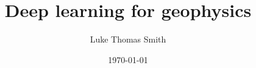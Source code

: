 \documentclass[12pt,a4paper,twocolumn]{report}
\begin{document}
\author{Luke Thomas Smith}
\title{Deep learning for geophysics}
\date{\today}
\maketitle{}
\tableofcontents
\listoffigures
\listoftables

% 
% 
% 
\clearpage
% 
\end{document}
